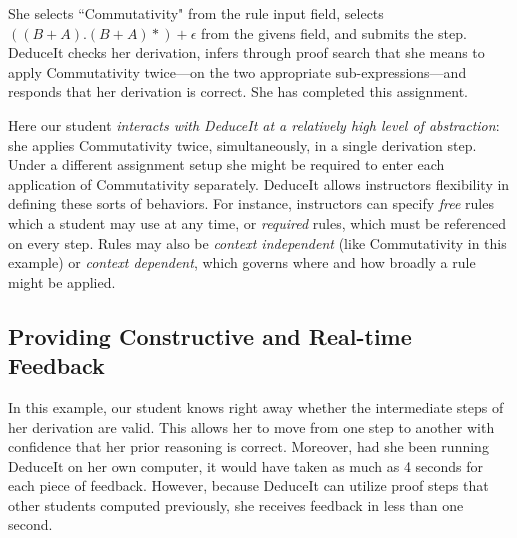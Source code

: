 \documentclass{sigchi}
\newcommand{\msb}[1]{\textbf{\textcolor{cyan}{Michael: #1}}}
\begin{document}
She selects ``Commutativity" from the rule input field, selects $((B+A).(B+A)*)+\epsilon$ from the givens field, and submits the step. DeduceIt checks her derivation, infers through proof search that she means to apply Commutativity twice---on the two appropriate sub-expressions---and responds that her derivation is correct. She has completed this assignment.

Here our student \textit{interacts with DeduceIt at a relatively high level of abstraction}: she applies Commutativity twice, simultaneously, in a single derivation step. Under a different assignment setup she might be required to enter each application of Commutativity separately. DeduceIt allows instructors flexibility in defining these sorts of behaviors. For instance, instructors can specify \textit{free} rules which a student may use at any time, or \textit{required} rules, which must be referenced on every step. Rules may also be \textit{context independent} (like Commutativity in this example) or \textit{context dependent}, which governs where and how broadly a rule might be applied.    %

\subsection{Providing Constructive and Real-time Feedback}

In this example, our student knows right away whether the intermediate steps of her derivation are valid. This allows her to move from one step to another with confidence that her prior reasoning is correct. Moreover, had she been running DeduceIt on her own computer, it would have taken as much  as 4 seconds for each piece of feedback. However, because DeduceIt can utilize proof steps that other students computed previously, she receives feedback in less than one second.
\end{document}
